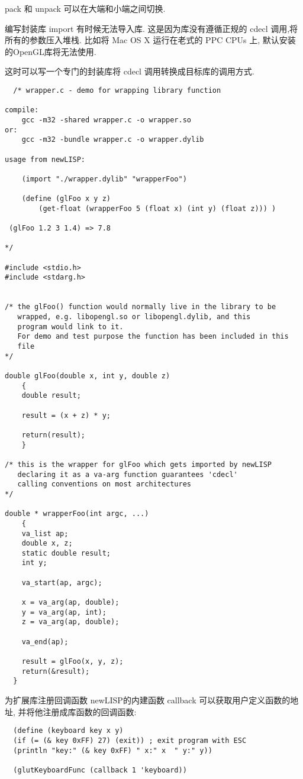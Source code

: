 \documentclass[cn,11pt]{elegantbook}
\begin{document}
pack 和 unpack 可以在大端和小端之间切换.


编写封装库
import 有时候无法导入库. 这是因为库没有遵循正规的 cdecl 调用,将所有的参数压入堆栈. 比如将 Mac OS X 运行在老式的 PPC CPUs 上, 默认安装的OpenGL库将无法使用.

这时可以写一个专门的封装库将 cdecl 调用转换成目标库的调用方式.

\begin{lstlisting}
  /* wrapper.c - demo for wrapping library function
 
compile:
    gcc -m32 -shared wrapper.c -o wrapper.so
or:
    gcc -m32 -bundle wrapper.c -o wrapper.dylib
 
usage from newLISP:
 
    (import "./wrapper.dylib" "wrapperFoo")
 
    (define (glFoo x y z)
        (get-float (wrapperFoo 5 (float x) (int y) (float z))) )
 
 (glFoo 1.2 3 1.4) => 7.8
 
*/
 
#include <stdio.h>
#include <stdarg.h>
 
 
/* the glFoo() function would normally live in the library to be
   wrapped, e.g. libopengl.so or libopengl.dylib, and this
   program would link to it.
   For demo and test purpose the function has been included in this
   file
*/
 
double glFoo(double x, int y, double z)
    {
    double result;
 
    result = (x + z) * y;
 
    return(result);
    }
 
/* this is the wrapper for glFoo which gets imported by newLISP
   declaring it as a va-arg function guarantees 'cdecl'
   calling conventions on most architectures
*/
 
double * wrapperFoo(int argc, ...)
    {
    va_list ap;
    double x, z;
    static double result;
    int y;
 
    va_start(ap, argc);
 
    x = va_arg(ap, double);
    y = va_arg(ap, int);
    z = va_arg(ap, double);
 
    va_end(ap);
 
    result = glFoo(x, y, z);
    return(&result);
  }
\end{lstlisting}

为扩展库注册回调函数
newLISP的内建函数 callback 可以获取用户定义函数的地址, 并将他注册成库函数的回调函数:
\begin{lstlisting}
  (define (keyboard key x y)
  (if (= (& key 0xFF) 27) (exit)) ; exit program with ESC
  (println "key:" (& key 0xFF) " x:" x  " y:" y))

  (glutKeyboardFunc (callback 1 'keyboard))
\end{lstlisting}
\end{document}
